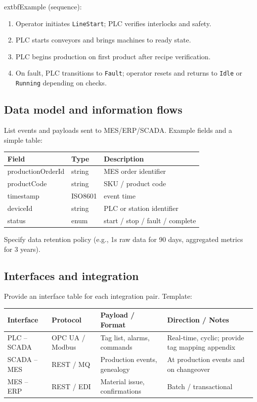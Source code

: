 \documentclass[a4paper,10pt]{article}
\begin{document}
  extbf{Example (sequence):}
\begin{enumerate}
  \item Operator initiates \texttt{LineStart}; PLC verifies interlocks and safety.
  \item PLC starts conveyors and brings machines to ready state.
  \item PLC begins production on first product after recipe verification.
  \item On fault, PLC transitions to \texttt{Fault}; operator resets and returns to \texttt{Idle} or \texttt{Running} depending on checks.
\end{enumerate}

\subsection*{Data model and information flows}
List events and payloads sent to MES/ERP/SCADA. Example fields and a simple table:
\begin{tabularx}{\textwidth}{|l|l|X|}
\hline
Field & Type & Description \\
\hline
productionOrderId & string & MES order identifier \\
productCode & string & SKU / product code \\
timestamp & ISO8601 & event time \\
deviceId & string & PLC or station identifier \\
status & enum & start / stop / fault / complete \\
\hline
\end{tabularx}

Specify data retention policy (e.g., 1s raw data for 90 days, aggregated 
metrics for 3 years).

\subsection*{Interfaces and integration}
Provide an interface table for each integration pair. Template:
\begin{tabularx}{\textwidth}{|>{\raggedright\arraybackslash}p{3.5cm}|>{\raggedright\arraybackslash}p{2.5cm}|>{\raggedright\arraybackslash}X|>{\raggedright\arraybackslash}X|}
\hline
Interface & Protocol & Payload / Format & Direction / Notes \\
\hline
PLC -- SCADA & OPC UA / Modbus & Tag list, alarms, commands & Real-time, cyclic; provide tag mapping appendix \\
SCADA -- MES & REST / MQ & Production events, genealogy & At production events and on changeover \\
MES -- ERP & REST / EDI & Material issue, confirmations & Batch / transactional \\
\hline
\end{tabularx}
\end{document}
